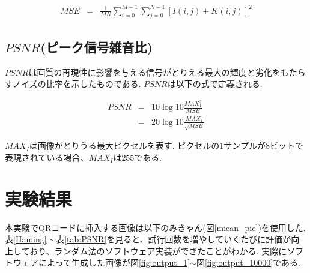 \documentclass{thesis}
\begin{document}
\begin{eqnarray}
MSE&=&\frac{1}{MN}\sum_{i=0}^{M-1}\sum_{j=0}^{N-1}[I(i,j)+K(i,j)]^2
\end{eqnarray}


\subsection{$PSNR$(ピーク信号雑音比)}

$PSNR$は画質の再現性に影響を与える信号がとりえる最大の輝度と劣化をもたらすノイズの比率を示したものである.
$PSNR$は以下の式で定義される.

\begin{eqnarray}
PSNR&=&10\log{10}\frac{MAX_I^2}{MSE} \\
       &=&20\log{10}\frac{MAX_I}{\sqrt{MSE}}
\end{eqnarray}

$MAX_{I}$は画像がとりうる最大ピクセルを表す.
ピクセルの$1$サンプルが$8$ビットで表現されている場合、$MAX_{I}$は$255$である.

\section{実験結果}

本実験でQRコードに挿入する画像は以下のみきゃん(図\ref{mican_pic})を使用した.
表\ref{Haming} $\sim$表\ref{tab:PSNR}を見ると、試行回数を増やしていくたびに評価が向上しており、ランダム法のソフトウェア実装ができたことがわかる.
実際にソフトウェアによって生成した画像が図\ref{fig:output_1}$\sim$図\ref{fig:output_10000}である.
\end{document}
